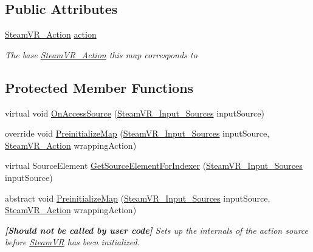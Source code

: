 \subsection*{Public Attributes}
\begin{DoxyCompactItemize}
\item 
\mbox{\hyperlink{class_valve_1_1_v_r_1_1_steam_v_r___action}{Steam\+V\+R\+\_\+\+Action}} \mbox{\hyperlink{class_valve_1_1_v_r_1_1_steam_v_r___action___source___map_a7ddefadc173dfeee8e2c423552283d80}{action}}
\begin{DoxyCompactList}\small\item\em The base \mbox{\hyperlink{class_valve_1_1_v_r_1_1_steam_v_r___action}{Steam\+V\+R\+\_\+\+Action}} this map corresponds to \end{DoxyCompactList}\end{DoxyCompactItemize}
\subsection*{Protected Member Functions}
\begin{DoxyCompactItemize}
\item 
virtual void \mbox{\hyperlink{class_valve_1_1_v_r_1_1_steam_v_r___action___source___map_a2a6c76774adb5719065c870202c4f29a}{On\+Access\+Source}} (\mbox{\hyperlink{namespace_valve_1_1_v_r_a82e5bf501cc3aa155444ee3f0662853f}{Steam\+V\+R\+\_\+\+Input\+\_\+\+Sources}} input\+Source)
\item 
override void \mbox{\hyperlink{class_valve_1_1_v_r_1_1_steam_v_r___action___source___map_ace2286a1aca371f6229a7f15c82f6329}{Preinitialize\+Map}} (\mbox{\hyperlink{namespace_valve_1_1_v_r_a82e5bf501cc3aa155444ee3f0662853f}{Steam\+V\+R\+\_\+\+Input\+\_\+\+Sources}} input\+Source, \mbox{\hyperlink{class_valve_1_1_v_r_1_1_steam_v_r___action}{Steam\+V\+R\+\_\+\+Action}} wrapping\+Action)
\item 
virtual Source\+Element \mbox{\hyperlink{class_valve_1_1_v_r_1_1_steam_v_r___action___source___map_a31d4929590d0a63ae7693b87424e9990}{Get\+Source\+Element\+For\+Indexer}} (\mbox{\hyperlink{namespace_valve_1_1_v_r_a82e5bf501cc3aa155444ee3f0662853f}{Steam\+V\+R\+\_\+\+Input\+\_\+\+Sources}} input\+Source)
\item 
abstract void \mbox{\hyperlink{class_valve_1_1_v_r_1_1_steam_v_r___action___source___map_adae017d1a61bcde0a40806b6e2251029}{Preinitialize\+Map}} (\mbox{\hyperlink{namespace_valve_1_1_v_r_a82e5bf501cc3aa155444ee3f0662853f}{Steam\+V\+R\+\_\+\+Input\+\_\+\+Sources}} input\+Source, \mbox{\hyperlink{class_valve_1_1_v_r_1_1_steam_v_r___action}{Steam\+V\+R\+\_\+\+Action}} wrapping\+Action)
\begin{DoxyCompactList}\small\item\em {\bfseries{\mbox{[}Should not be called by user code\mbox{]}}} Sets up the internals of the action source before \mbox{\hyperlink{class_valve_1_1_v_r_1_1_steam_v_r}{Steam\+VR}} has been initialized. \end{DoxyCompactList}\end{DoxyCompactItemize}
